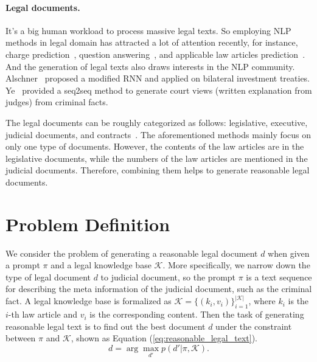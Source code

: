 \documentclass{article}
\begin{document}
\paragraph{Legal documents.} 
It's a big human workload to process massive legal texts. 
So employing NLP methods in legal domain has attracted a lot of attention recently, for instance,  charge prediction~\cite{luo2017learning_charge,hu2018few_charge,chen2019charge}, question answering~\cite{zhong2020jec}, and applicable law articles prediction~\cite{zhong2018judgement_prediction}.
And the generation of legal texts also draws interests in the NLP community.  
Alschner~ proposed a modified RNN and applied on bilateral investment treaties. 
Ye~ provided a seq2seq method to generate court views (written explanation from judges) from criminal facts. 

The legal documents can be roughly categorized as follows: legislative, executive, judicial documents, and contracts~\cite{gostojic2019legal}. 
The aforementioned methods mainly focus on only one type of documents. 
However, the contents of the law articles are in the legislative documents, while the numbers of the law articles are mentioned in the judicial documents. 
Therefore, combining them helps to generate reasonable legal documents.

\section{Problem Definition}
\label{sec:problem}
We consider the problem of generating a reasonable legal document $d$ when given a prompt $\pi$ and a legal knowledge base $\mathcal{K}$.
More specifically, we narrow down the type of legal document $d$ to judicial document, so the prompt $\pi$ is a text sequence for describing the meta information of the judicial document, such as the criminal fact. 
A legal knowledge base is formalized as $\mathcal{K}=\{(k_i,v_i)\}_{i=1}^{|\mathcal{K}|}$, where $k_i$ is the $i$-th law article and $v_i$ is the corresponding content.
Then the task of generating reasonable legal text is to find out the best document $d$ under the constraint between $\pi$ and $\mathcal{K}$, shown as Equation (\ref{eq:reasonable_legal_text}). 
\begin{equation}
d = \arg \max_{d'} p(d'|\pi, \mathcal{K}).
\label{eq:reasonable_legal_text}
\end{equation}
\end{document}
